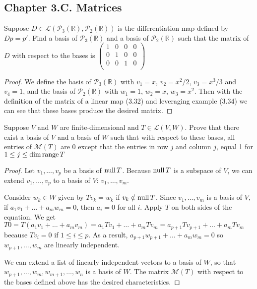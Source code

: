\subsection*{Chapter 3.C. Matrices}


\begin{exercise}{2}
 Suppose $D\in\mathcal{L}(\mathcal{P}_{3}(\mathbb{R}), \mathcal{P}_{2}(\mathbb{R}))$ is the differentiation map defined by $Dp=p'$. Find a basis of $\mathcal{P}_{3}(\mathbb{R})$ and a basis of $\mathcal{P}_{2}(\mathbb{R})$ such that the matrix of $D$ with respect to the bases is 
 $\begin{pmatrix}
 1 & 0 & 0 & 0\\
 0 & 1 & 0 & 0\\
 0 & 0 & 1 & 0\\
 \end{pmatrix}$
\end{exercise}
\begin{proof}
 We define the basis of $\mathcal{P}_{3}(\mathbb{R})$ with $v_{1}=x$, $v_{2}=x^{2}/2$, $v_{3}=x^{3}/3$ and $v_{4}=1$, and the basis of $\mathcal{P}_{2}(\mathbb{R})$ with $w_{1}=1$, $w_{2}=x$, $w_{3}=x^{2}$. Then with the definition of the matrix of a linear map (3.32) and leveraging example (3.34) we can see that these bases produce the desired matrix.
\end{proof}


\begin{exercise}{3}
 Suppose $V$ and $W$ are finite-dimensional and $T\in\mathcal{L}(V,W)$. Prove that there exist a basis of $V$ and a basis of $W$ such that with respect to these bases, all entries of $\mathcal{M}(T)$ are 0 except that the entries in row $j$ and column $j$, equal 1 for $1\leq j\leq \dim\operatorname*{range} T$
\end{exercise}
\begin{proof}
 Let $v_{1},\dots, v_{p}$ be a basis of $\operatorname*{null} T$. Because $\operatorname*{null} T$ is a subspace of $V$, we can extend $v_{1},\dots, v_{p}$ to a basis of $V$: $v_{1},\dots, v_{m}$. 
 
 Consider $w_{k}\in W$ given by $Tv_{k}=w_{k}$ if $v_{k}\notin\operatorname*{null} T$. Since $v_{1},\dots,v_{m}$ is a basis of $V$, if $a_{1}v_{1}+\dots+a_{m}w_{m} = 0$, then $a_{i}=0$ for all $i$. Apply $T$ on both sides of the equation. We get $T0 = T(a_{1}v_{1}+\dots+a_{m}v_{m}) = a_{1}Tv_{1}+\dots+a_{m}Tv_{m} = a_{p+1}Tv_{p+1}+\dots+a_{m}Tv_{m}$ because $Tv_{i}=0$ if $1\leq i\leq p$. As a result, $a_{p+1}w_{p+1}+\dots+a_{m}w_{m}=0$ so $w_{p+1},\dots,w_{m}$ are linearly independent.
 
 We can extend a list of linearly independent vectors to a basis of $W$, so that $w_{p+1},\dots,w_{m}, w_{m+1},\dots, w_{n}$ is a basis of $W$. The matrix $\mathcal{M}(T)$ with respect to the bases defined above has the desired characteristics.
\end{proof}



